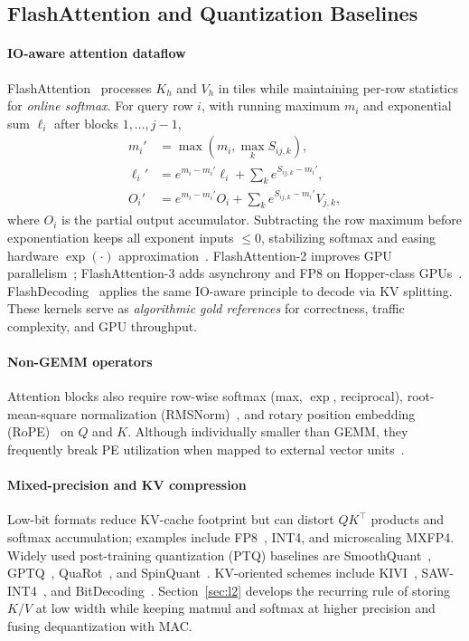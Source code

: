 \documentclass[conference]{IEEEtran}
\begin{document}
\subsection{FlashAttention and Quantization Baselines}
\label{sec:intro-baselines}

\paragraph{IO-aware attention dataflow}
FlashAttention~\cite{dao2022flashattention} processes $K_h$ and $V_h$ in tiles while maintaining per-row statistics for \emph{online softmax}.
For query row $i$, with running maximum $m_i$ and exponential sum $\ell_i$ after blocks $1,\ldots,j{-}1$,
\begin{align}
m_i' &= \max(m_i, \max_k S_{ij,k}), \label{eq:online-max}\\
\ell_i' &= e^{m_i - m_i'} \ell_i + \textstyle\sum_k e^{S_{ij,k} - m_i'}, \label{eq:online-sum}\\
O_i' &= e^{m_i - m_i'} O_i + \textstyle\sum_k e^{S_{ij,k} - m_i'} V_{j,k}, \label{eq:online-o}
\end{align}
where $O_i$ is the partial output accumulator.
Subtracting the row maximum before exponentiation keeps all exponent inputs $\leq 0$, stabilizing softmax and easing hardware $\exp(\cdot)$ approximation~\cite{lin2025systolicattention,koca2023exp}.
FlashAttention-2 improves GPU parallelism~\cite{dao2023flashattention2}; FlashAttention-3 adds asynchrony and FP8 on Hopper-class GPUs~\cite{shah2024flashattention3,micikevicius2022fp8}.
FlashDecoding~\cite{dao2023flashdecoding} applies the same IO-aware principle to decode via KV splitting.
These kernels serve as \emph{algorithmic gold references} for correctness, traffic complexity, and GPU throughput.

\paragraph{Non-GEMM operators}
Attention blocks also require row-wise softmax (max, $\exp$, reciprocal), root-mean-square normalization (RMSNorm)~\cite{zhang2019root}, and rotary position embedding (RoPE)~\cite{su2024roformer} on $Q$ and $K$.
Although individually smaller than GEMM, they frequently break PE utilization when mapped to external vector units~\cite{wang2023cosa,mive2026,sole2025}.

\paragraph{Mixed-precision and KV compression}
Low-bit formats reduce KV-cache footprint but can distort $QK^\top$ products and softmax accumulation; examples include FP8~\cite{micikevicius2022fp8}, INT4, and microscaling MXFP4.
Widely used post-training quantization (PTQ) baselines are SmoothQuant~\cite{xiao2023smoothquant}, GPTQ~\cite{frantar2023gptq}, QuaRot~\cite{ashkboos2024quarot}, and SpinQuant~\cite{liu2024spinquant}.
KV-oriented schemes include KIVI~\cite{liu2024kivi}, SAW-INT4~\cite{sawint42026}, and BitDecoding~\cite{bitdecoding2026}.
Section~\ref{sec:l2} develops the recurring rule of storing $K/V$ at low width while keeping matmul and softmax at higher precision and fusing dequantization with MAC.
\end{document}
